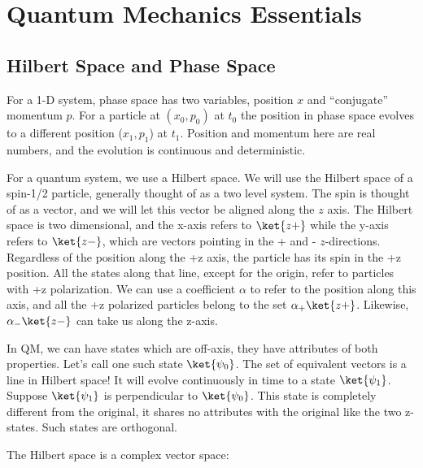 \documentclass[a4paper,twoside,master.tex]{subfiles}
\begin{document}
\chapter{Quantum Mechanics Essentials}
\section{Hilbert Space and Phase Space}
\label{sec:hilbert_space_and_phase_space}

For a 1-D system, phase space has two variables, position $x$ and ``conjugate'' momentum $p$. For a particle at $(x_0, p_0)$ at $t_0$ the position in phase space evolves to a different position ($x_1, p_1$) at $t_1$. Position and momentum here are real numbers, and the evolution is continuous and deterministic.

For a quantum system, we use a Hilbert space. We will use the Hilbert space of a spin-1/2 particle, generally thought of as a two level system. The spin is thought of as a vector, and we will let this vector be aligned along the $z$ axis. The Hilbert space is two dimensional, and the x-axis refers to $\ket{z+}$ while the y-axis refers to $\ket{z-}$, which are vectors pointing in the + and - $z$-directions. Regardless of the position along the +z axis, the particle has its spin in the +z position. All the states along that line, except for the origin, refer to particles with +z polarization. We can use a coefficient $\alpha$ to refer to the position along this axis, and all the +z polarized particles belong to the set ${\alpha_+\ket{z+}}$. Likewise, $\alpha_-\ket{z-}$ can take us along the z-axis.

In QM, we can have states which are off-axis, they have attributes of
both properties. Let's call one such state $\ket{\psi_0}$. The set
of equivalent vectors is a line in Hilbert space! It will evolve
continuously in time to a state $\ket{\psi_1}$. Suppose
$\ket{\psi_1}$ is perpendicular to $\ket{\psi_0}$. This state is
completely different from the original, it shares no attributes with the
original like the two z-states. Such states are orthogonal.

The Hilbert space is a complex vector space:
\end{document}
